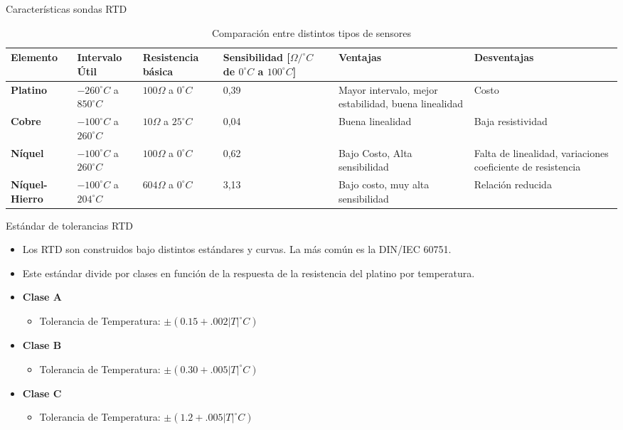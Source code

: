 \documentclass[aspectratio=169]{beamer}
\begin{document}
\begin{frame}{Características sondas RTD}
  \begin{table}[]
    \centering
    \scriptsize{
    \begin{tabular}{m{1.1cm}|m{2.2cm}|m{1.5cm}|m{1.8cm} | m{2.6cm}|m{2.6cm}}
     \hline
         \hline
        \textbf{Elemento} & \textbf{Intervalo Útil} &\textbf{Resistencia básica} & \textbf{Sensibilidad [$\Omega/^{\circ} C$ de $0^{\circ} C$ a $100^{\circ} C$]} & \textbf{Ventajas} & \textbf{Desventajas}\\
         \hline
         \hline
       \textbf{Platino} & $-260 ^{\circ} C$ a $ 850^{\circ} C$ & $100\Omega$ a $0 ^{\circ} C$   & 0,39 & Mayor intervalo, mejor estabilidad, buena linealidad & Costo\\
       \textbf{Cobre} & $-100 ^{\circ} C$ a $ 260^{\circ} C$ & $10\Omega$ a $25 ^{\circ} C$   & 0,04 & Buena linealidad & Baja resistividad\\
       \textbf{Níquel} &  $-100 ^{\circ} C$ a $ 260^{\circ} C$ & $100\Omega$ a $0 ^{\circ} C$   & 0,62 & Bajo Costo, Alta sensibilidad & Falta de linealidad, variaciones coeficiente de resistencia\\
       \textbf{Níquel-Hierro} & $-100 ^{\circ} C$ a $ 204^{\circ} C$ & $604\Omega$ a $0 ^{\circ} C$   & 3,13 & Bajo costo, muy alta sensibilidad & Relación reducida\\
    \end{tabular}
    }
    \caption{Comparación entre distintos tipos de sensores\cite{sole2005instrumentacion}}
    \label{tab:Caracteristicas _rtd}
\end{table}
\end{frame}

\begin{frame}{Estándar de tolerancias RTD}
 \begin{itemize}
     \item Los RTD son construidos bajo distintos estándares y curvas. La más común es la DIN/IEC 60751.
     \item Este estándar divide por clases en función de la respuesta de la resistencia del platino por temperatura. 
     \item \textbf{Clase A}
     \begin{itemize}
         \item Tolerancia de Temperatura: $\pm (0.15 + .002|T| ^\circ C)$
     \end{itemize}
      \item \textbf{Clase B}
     \begin{itemize}
         \item Tolerancia de Temperatura: $\pm (0.30 + .005|T| ^\circ C)$
         \end{itemize}
    \item \textbf{Clase C}
     \begin{itemize}
         \item Tolerancia de Temperatura: $\pm (1.2 + .005|T| ^\circ C)$
     \end{itemize}
 \end{itemize}
\end{frame}
\end{document}
